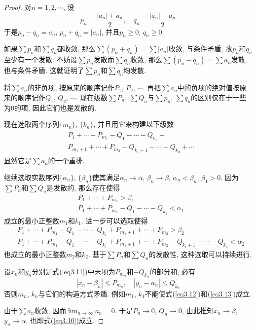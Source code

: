 \documentclass[cn,12pt,math=mtpro2,citestyle=gb7714-2015,bibstyle=gb7714-2015,twocol]{elegantbook}
\newcommand{\limn }{\lim_{n\to\infty}}
\begin{document}
\begin{proof}
  对$n=1,2,\cdots$, 设
  $$p_n=\frac{|a_n|+a_n}{2},\quad q_n=\frac{|a_n|-a_n}{2}$$
  于是$p_n-q_n=a_n$, $p_n+q_n=|a_n|$, 并且$p_n\geq 0$, $q_n\geq 0$.

  如果$\sum p_n$和$\sum q_n$都收敛, 那么$\sum (p_n+q_n)=\sum|a_n|$收敛, 与条件矛盾, 故$p_n$和$q_n$至少有一个发散. 不妨设$\sum p_n$发散而$\sum q_n$收敛, 那么$\sum (p_n-q_n)=\sum a_n$发散, 也与条件矛盾. 这就证明了$\sum p_n$和$\sum q_n$均发散.

  将$\sum a_n$的非负项, 按原来的顺序记作$P_1$, $P_2$, $\cdots$. 再把$\sum a_n$中的负项的绝对值按原来的顺序记作$Q_1$, $Q_2$, $\cdots$. 现在级数$\sum P_n$, $\sum Q_n$与$\sum p_n$, $\sum q_n$的区别仅在于一些为0的项, 因此它们也是发散的.

  现在选取两个序列$\{m_n\}$, $\{k_n\}$, 并且用它来构建以下级数
  \begin{align}\label{eq3.11}
  \begin{split}
    &P_1+\cdots+P_{m_1}-Q_1-\cdots-Q_{k_1}+ \\
    &P_{m_1+1}+\cdots+P_{m_2}-Q_{k_1+1}-\cdots-Q_{k_2}+\cdots
    \end{split}
  \end{align}
  显然它是$\sum a_n$的一个重排.

  继续选取实数序列$\{\alpha_n\}$, $\{\beta_n\}$使其满足$\alpha_n\rightarrow\alpha$, $\beta_n\rightarrow\beta$, $\alpha_n<\beta_n$, $\beta_1>0$. 因为$\sum P_n$和$\sum Q_n$是发散的, 那么存在使得
  \begin{align}
  &P_1+\cdots+P_{m_1}>\beta_1  \label{eq3.12} \\
  &P_1+\cdots+P_{m_1}-Q_1-\cdots-Q_{k_1}<\alpha_1 \label{eq3.13}
  \end{align}
  成立的最小正整数$m_1$和$k_1$. 进一步可以选取使得
  \begin{align*}
  &P_1+\cdots+P_{m_1}-Q_1-\cdots-Q_{k_1}+P_{m_1+1}+\cdots+P_{m_2}>\beta_2 \\
  &P_1+\cdots+P_{m_1}-Q_1-\cdots-Q_{k_1}+P_{m_1+1}+\cdots+P_{m_2}-Q_{k_1+1}-\cdots-Q_{k_2}<\alpha_2
  \end{align*}
  也成立的最小正整数$m_2$和$k_2$. 基于$\sum P_n$和$\sum Q_n$的发散性, 这种选取可以持续进行.

  设$x_n$和$y_n$分别是式(\ref{eq3.11})中末项为$P_{m_n}$和$-Q_{k_n}$的部分和, 必有
  $$|x_n-\beta_n|\leq P_{m_n},\quad |y_n-\alpha_n|\leq Q_{k_n}$$
  否则$m_n$, $k_n$与它们的构造方式矛盾. 例如$m_1$, $k_1$不能使式(\ref{eq3.12})和(\ref{eq3.13})成立.

  由于$\sum a_n$收敛, 因而$\displaystyle \limn  a_n=0$. 于是$P_n\rightarrow 0$, $Q_n\rightarrow 0$, 由此推知$x_n\rightarrow\beta$, $y_n\rightarrow\alpha$, 也即式(\ref{eq3.10})成立.


\end{proof}
\end{document}
